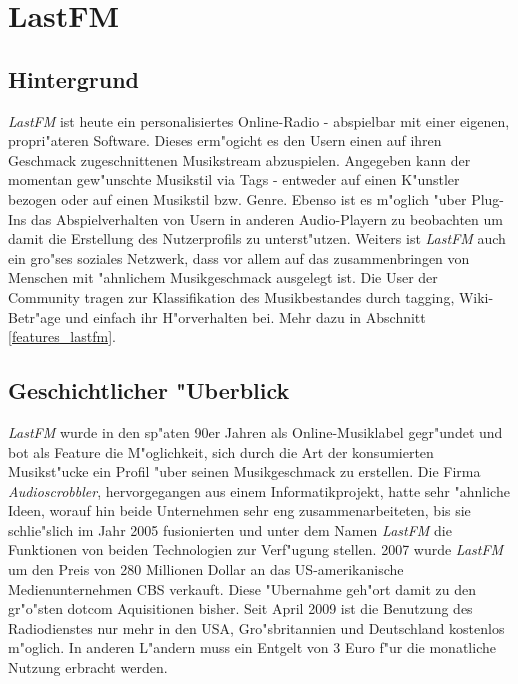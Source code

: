 \section{LastFM}
\subsection{Hintergrund}
\textit{LastFM} ist heute ein personalisiertes Online-Radio - abspielbar mit einer eigenen, propri"ateren Software. Dieses erm"ogicht es den Usern einen auf ihren Geschmack zugeschnittenen Musikstream abzuspielen. Angegeben kann der momentan gew"unschte Musikstil via Tags - entweder auf einen K"unstler bezogen oder auf einen Musikstil bzw. Genre. Ebenso ist es m"oglich "uber Plug-Ins das Abspielverhalten von Usern in anderen Audio-Playern zu beobachten um damit die Erstellung des Nutzerprofils zu unterst"utzen.
Weiters ist \textit{LastFM} auch ein gro"ses soziales Netzwerk, dass vor allem auf das zusammenbringen von Menschen mit "ahnlichem Musikgeschmack ausgelegt ist. Die User der Community tragen zur Klassifikation des Musikbestandes durch tagging, Wiki-Betr"age und einfach ihr H"orverhalten bei. Mehr dazu in Abschnitt \ref{features_lastfm}.

\subsection{Geschichtlicher "Uberblick}
\textit{LastFM} wurde in den sp"aten 90er Jahren als Online-Musiklabel gegr"undet und bot als Feature die M"oglichkeit, sich durch die Art der konsumierten Musikst"ucke ein Profil "uber seinen Musikgeschmack zu erstellen. Die Firma \textit{Audioscrobbler}, hervorgegangen aus einem Informatikprojekt, hatte sehr "ahnliche Ideen, worauf hin beide Unternehmen sehr eng zusammenarbeiteten, bis sie schlie"slich im Jahr 2005 fusionierten und unter dem Namen \textit{LastFM} die Funktionen von beiden Technologien zur Verf"ugung stellen.
2007 wurde \textit{LastFM} um den Preis von 280 Millionen Dollar an das US-amerikanische Medienunternehmen CBS verkauft. Diese "Ubernahme geh"ort damit zu den gr"o"sten dotcom Aquisitionen bisher. 
Seit April 2009 ist die Benutzung des Radiodienstes nur mehr in den USA, Gro"sbritannien und Deutschland kostenlos m"oglich. In anderen L"andern muss ein Entgelt von 3 Euro f"ur die monatliche Nutzung erbracht werden.



